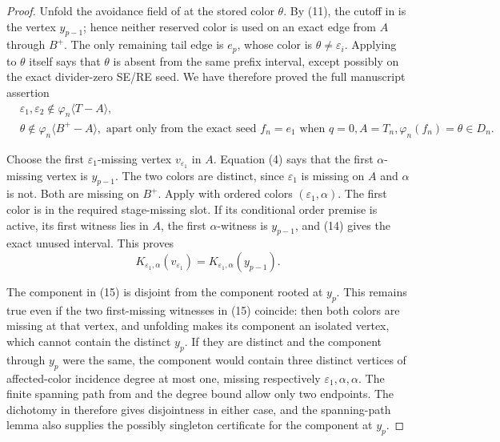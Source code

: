 \begin{proof}
Unfold the avoidance field of  at the stored
color \(\theta\).  By (11), the cutoff in
 is the vertex \(y_{p-1}\); hence
neither reserved color is used on an exact edge from \(A\) through
\(B^+\).  The only remaining tail edge is \(e_p\), whose color is
\(\theta\ne\varepsilon_i\).  Applying
 to \(\theta\) itself says
that \(\theta\) is absent from the same prefix interval, except
possibly on the exact divider-zero SE/RE seed.  We have therefore proved
the full manuscript assertion
\[
 \begin{split}
 &\varepsilon_1,\varepsilon_2
       \notin\varphi_n\langle T-A\rangle,\\
 &\theta\notin\varphi_n\langle B^+-A\rangle,
   \text{ apart only from the exact seed }f_n=e_1
   \text{ when }q=0, A=T_n, \varphi_n(f_n)=\theta\in D_n.
 \end{split}                                                  \tag{14}
\]

Choose the first \(\varepsilon_1\)-missing vertex
\(v_{\varepsilon_1}\) in \(A\).  Equation (4) says that the first
\(\alpha\)-missing vertex is \(y_{p-1}\).  The two colors are
distinct, since \(\varepsilon_1\) is missing on \(A\) and \(\alpha\)
is not.  Both are missing on \(B^+\).  Apply
 with ordered colors
\((\varepsilon_1,\alpha)\).  The first color is in the required
stage-missing slot.  If its conditional order premise is active, its
first witness lies in \(A\), the first \(\alpha\)-witness is
\(y_{p-1}\), and (14) gives the exact unused interval.  This proves
\[
 K_{\varepsilon_1,\alpha}(v_{\varepsilon_1})
      =K_{\varepsilon_1,\alpha}(y_{p-1}).                    \tag{15}
\]

The component in (15) is disjoint from the component rooted at \(y_p\).
This remains true even if the two first-missing witnesses in (15)
coincide: then both colors are missing at that vertex, and unfolding
 makes its component an isolated vertex,
which cannot contain the distinct \(y_p\).  If they are distinct and
the component through \(y_p\) were the same, the component would contain
three distinct vertices of affected-color incidence degree at most one,
missing respectively \(\varepsilon_1,\alpha,\alpha\).  The finite
spanning path from  and the
degree bound  allow only two
endpoints.  The dichotomy in 
therefore gives disjointness in either case, and the spanning-path lemma
also supplies the possibly singleton 
certificate for the component at \(y_p\).


\end{proof}
